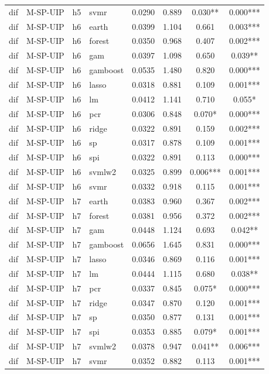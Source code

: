 \begin{ThreePartTable}
\begin{longtable}[t]{llclcccc}
dif & M-SP-UIP & h5 & svmr & 0.0290 & 0.889 & 0.030** & 0.000***\\
\addlinespace
dif & M-SP-UIP & h6 & earth & 0.0399 & 1.104 & 0.661 & 0.003***\\
dif & M-SP-UIP & h6 & forest & 0.0350 & 0.968 & 0.407 & 0.002***\\
dif & M-SP-UIP & h6 & gam & 0.0397 & 1.098 & 0.650 & 0.039**\\
dif & M-SP-UIP & h6 & gamboost & 0.0535 & 1.480 & 0.820 & 0.000***\\
dif & M-SP-UIP & h6 & lasso & 0.0318 & 0.881 & 0.109 & 0.001***\\
dif & M-SP-UIP & h6 & lm & 0.0412 & 1.141 & 0.710 & 0.055*\\
dif & M-SP-UIP & h6 & pcr & 0.0306 & 0.848 & 0.070* & 0.000***\\
dif & M-SP-UIP & h6 & ridge & 0.0322 & 0.891 & 0.159 & 0.002***\\
dif & M-SP-UIP & h6 & sp & 0.0317 & 0.878 & 0.109 & 0.001***\\
dif & M-SP-UIP & h6 & spi & 0.0322 & 0.891 & 0.113 & 0.000***\\
dif & M-SP-UIP & h6 & svmlw2 & 0.0325 & 0.899 & 0.006*** & 0.001***\\
dif & M-SP-UIP & h6 & svmr & 0.0332 & 0.918 & 0.115 & 0.001***\\
\addlinespace
dif & M-SP-UIP & h7 & earth & 0.0383 & 0.960 & 0.367 & 0.002***\\
dif & M-SP-UIP & h7 & forest & 0.0381 & 0.956 & 0.372 & 0.002***\\
dif & M-SP-UIP & h7 & gam & 0.0448 & 1.124 & 0.693 & 0.042**\\
dif & M-SP-UIP & h7 & gamboost & 0.0656 & 1.645 & 0.831 & 0.000***\\
dif & M-SP-UIP & h7 & lasso & 0.0346 & 0.869 & 0.116 & 0.001***\\
dif & M-SP-UIP & h7 & lm & 0.0444 & 1.115 & 0.680 & 0.038**\\
dif & M-SP-UIP & h7 & pcr & 0.0337 & 0.845 & 0.075* & 0.000***\\
dif & M-SP-UIP & h7 & ridge & 0.0347 & 0.870 & 0.120 & 0.001***\\
dif & M-SP-UIP & h7 & sp & 0.0350 & 0.877 & 0.131 & 0.001***\\
dif & M-SP-UIP & h7 & spi & 0.0353 & 0.885 & 0.079* & 0.001***\\
dif & M-SP-UIP & h7 & svmlw2 & 0.0378 & 0.947 & 0.041** & 0.006***\\
dif & M-SP-UIP & h7 & svmr & 0.0352 & 0.882 & 0.113 & 0.001***\\

\end{longtable}
\end{ThreePartTable}

